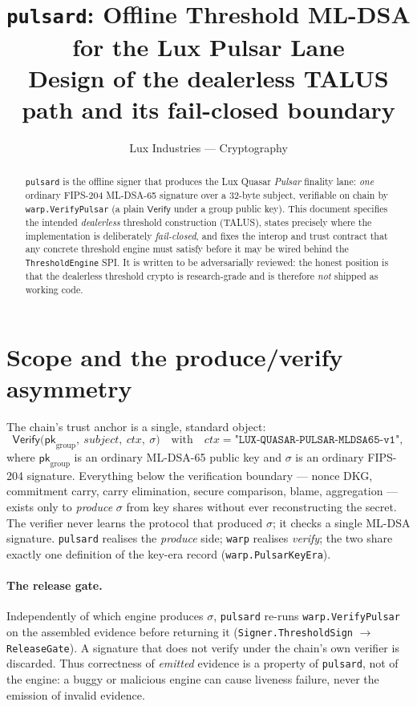 \documentclass[11pt]{article}
\title{\texttt{pulsard}: Offline Threshold ML-DSA for the Lux Pulsar Lane\\
\large Design of the dealerless TALUS path and its fail-closed boundary}
\author{Lux Industries --- Cryptography}
\date{}
\newcommand{\Verify}{\mathsf{Verify}}
\newcommand{\ctx}{\mathit{ctx}}
\newcommand{\subj}{\mathit{subject}}
\theoremstyle{definition}
\theoremstyle{plain}
\begin{document}
\maketitle

\begin{abstract}
\texttt{pulsard} is the offline signer that produces the Lux Quasar
\emph{Pulsar} finality lane: \emph{one} ordinary FIPS-204 ML-DSA-65 signature
over a $32$-byte subject, verifiable on chain by \texttt{warp.VerifyPulsar} (a
plain \(\Verify\) under a group public key). This document specifies the
intended \emph{dealerless} threshold construction (TALUS), states precisely
where the implementation is deliberately \emph{fail-closed}, and fixes the
interop and trust contract that any concrete threshold engine must satisfy
before it may be wired behind the \texttt{ThresholdEngine} SPI. It is written to
be adversarially reviewed: the honest position is that the dealerless threshold
crypto is research-grade and is therefore \emph{not} shipped as working code.
\end{abstract}

\section{Scope and the produce/verify asymmetry}

The chain's trust anchor is a single, standard object:
\[
\Verify\bigl(\mathsf{pk}_{\text{group}},\ \subj,\ \ctx,\ \sigma\bigr)
\quad\text{with}\quad
\ctx = \texttt{"LUX-QUASAR-PULSAR-MLDSA65-v1"},
\]
where \(\mathsf{pk}_{\text{group}}\) is an ordinary ML-DSA-65 public key and
\(\sigma\) is an ordinary FIPS-204 signature. Everything below the verification
boundary --- nonce DKG, commitment carry, carry elimination, secure comparison,
blame, aggregation --- exists only to \emph{produce} \(\sigma\) from key shares
without ever reconstructing the secret. The verifier never learns the protocol
that produced \(\sigma\); it checks a single ML-DSA signature. \texttt{pulsard}
realises the \emph{produce} side; \texttt{warp} realises \emph{verify}; the two
share exactly one definition of the key-era record (\texttt{warp.PulsarKeyEra}).

\paragraph{The release gate.} Independently of which engine produces \(\sigma\),
\texttt{pulsard} re-runs \texttt{warp.VerifyPulsar} on the assembled evidence
before returning it (\texttt{Signer.ThresholdSign} $\to$ \texttt{ReleaseGate}).
A signature that does not verify under the chain's own verifier is discarded.
Thus correctness of \emph{emitted} evidence is a property of \texttt{pulsard},
not of the engine: a buggy or malicious engine can cause liveness failure, never
the emission of invalid evidence.
\end{document}
